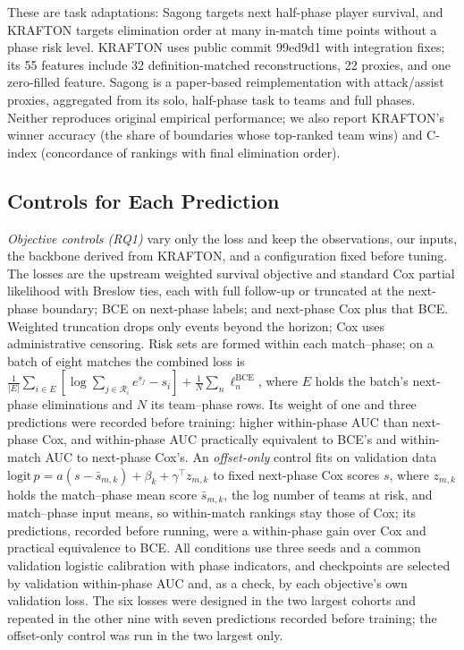 \documentclass[sigconf,anonymous,nonacm]{acmart}
\begin{document}
These are task adaptations: Sagong targets next half-phase player survival, and KRAFTON targets elimination order at many in-match time points without a phase risk level. KRAFTON uses public commit 99ed9d1 with integration fixes; its 55 features include 32 definition-matched reconstructions, 22 proxies, and one zero-filled feature. Sagong is a paper-based reimplementation with attack/assist proxies, aggregated from its solo, half-phase task to teams and full phases. Neither reproduces original empirical performance; we also report KRAFTON's winner accuracy (the share of boundaries whose top-ranked team wins) and C-index (concordance of rankings with final elimination order).

\subsection{Controls for Each Prediction}
\label{sec:method:decomposition}
\emph{Objective controls (RQ1)} vary only the loss and keep the observations, our inputs, the backbone derived from KRAFTON, and a configuration fixed before tuning. The losses are the upstream weighted survival objective and standard Cox partial likelihood with Breslow ties, each with full follow-up or truncated at the next-phase boundary; BCE on next-phase labels; and next-phase Cox plus that BCE. Weighted truncation drops only events beyond the horizon; Cox uses administrative censoring. Risk sets are formed within each match--phase; on a batch of eight matches the combined loss is $\frac{1}{|E|}\sum_{i\in E}[\log\sum_{j\in\mathcal{R}_i}e^{s_j}-s_i]+\frac{1}{N}\sum_{n}\ell^{\mathrm{BCE}}_n$, where $E$ holds the batch's next-phase eliminations and $N$ its team--phase rows. Its weight of one and three predictions were recorded before training: higher within-phase AUC than next-phase Cox, and within-phase AUC practically equivalent to BCE's and within-match AUC to next-phase Cox's. An \emph{offset-only} control fits on validation data $\mathrm{logit}\,p=a(s-\bar s_{m,k})+\beta_k+\gamma^{\top}z_{m,k}$ to fixed next-phase Cox scores $s$, where $z_{m,k}$ holds the match--phase mean score $\bar s_{m,k}$, the log number of teams at risk, and match--phase input means, so within-match rankings stay those of Cox; its predictions, recorded before running, were a within-phase gain over Cox and practical equivalence to BCE. All conditions use three seeds and a common validation logistic calibration with phase indicators, and checkpoints are selected by validation within-phase AUC and, as a check, by each objective's own validation loss. The six losses were designed in the two largest cohorts and repeated in the other nine with seven predictions recorded before training; the offset-only control was run in the two largest only.
\end{document}
